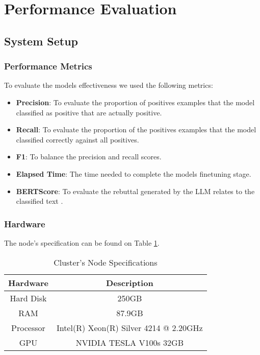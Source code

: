 \section{Performance Evaluation}
\subsection{System Setup}
\subsubsection{Performance Metrics}
To evaluate the models effectiveness we used the following metrics:

\begin{itemize}
	\item{\textbf{Precision}}: To evaluate the proportion of positives examples that the model classified as positive that are actually positive. 
	\item{\textbf{Recall}}: To evaluate the proportion of the positives examples that the model classified correctly against all positives.
	\item{\textbf{F1}}: To balance the precision and recall scores.
	\item{\textbf{Elapsed Time}}: The time needed to complete the models finetuning stage.
	\item{\textbf{BERTScore}}: To evaluate the rebuttal generated by the LLM relates to the classified text \cite{zhang2020bertscoreevaluatingtextgeneration}.
\end{itemize}

\subsubsection{Hardware}
The node's specification can be found on Table \ref{table:hardware}.
\begin{table}[htbp]
\centering
\caption{Cluster's Node Specifications}
{\footnotesize
\begin{tabular}{||c | c||} 
 \hline
\textbf{Hardware} & \textbf{Description} \\ 
 \hline
 Hard Disk & 250GB  \\ 
 \hline
 RAM & 87.9GB  \\ 
 \hline
 Processor & Intel(R) Xeon(R) Silver 4214 @ 2.20GHz \\ 
 \hline
 GPU & NVIDIA TESLA V100s 32GB \\
 \hline
\end{tabular}
}
\label{table:hardware}
\end{table}

